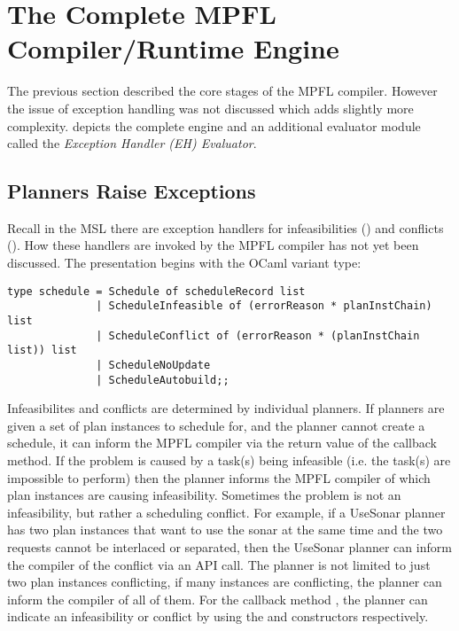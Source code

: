 \section{The Complete MPFL Compiler/Runtime Engine}
The previous section described the core stages of the MPFL compiler. However the issue of exception handling was not discussed which adds slightly more complexity.  depicts the complete engine and an additional evaluator module called the \textit{Exception Handler (EH) Evaluator}.


\subsection{Planners Raise Exceptions}
Recall in the MSL there are exception handlers for infeasibilities () and conflicts (). How these handlers are invoked by the MPFL compiler has not yet been discussed. The presentation begins with the  OCaml variant type:

\begin{verbatim}
type schedule = Schedule of scheduleRecord list 
              | ScheduleInfeasible of (errorReason * planInstChain) list 
              | ScheduleConflict of (errorReason * (planInstChain list)) list 
              | ScheduleNoUpdate
              | ScheduleAutobuild;;
\end{verbatim}

Infeasibilites and conflicts are determined by individual planners. If planners are given a set of plan instances to schedule for, and the planner cannot create a schedule, it can inform the MPFL compiler via the return value of the  callback method. If the problem is caused by a task(s) being infeasible (i.e. the task(s) are impossible to perform) then the planner informs the MPFL compiler of which plan instances are causing infeasibility. Sometimes the problem is not an infeasibility, but rather a scheduling conflict. For example, if a UseSonar planner has two plan instances that want to use the sonar at the same time and the two requests cannot be interlaced or separated, then the UseSonar planner can inform the compiler of the conflict via an API call. The planner is not limited to just two plan instances conflicting, if many instances are conflicting, the planner can inform the compiler of all of them. For the callback method , the planner can indicate an infeasibility or conflict by using the  and  constructors respectively.


